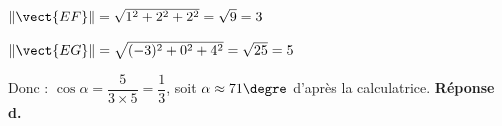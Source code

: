\begin{enumerate}
	$\left\|\vect{EF}\right\| = \sqrt{1^2 + 2^2 + 2^2} = \sqrt{9} = 3$
	
	$\left\|\vect{EG}\right\| = \sqrt{(-3)^2 + 0^2 + 4^2} = \sqrt{25} = 5$
	
	Donc :
	$\cos \alpha = \dfrac{5}{3 \times 5} = \dfrac{1}{3}$, soit $\alpha \approx 71\degre$ d'après la calculatrice.
	\textbf{Réponse d.}
\end{enumerate}

\bigskip
